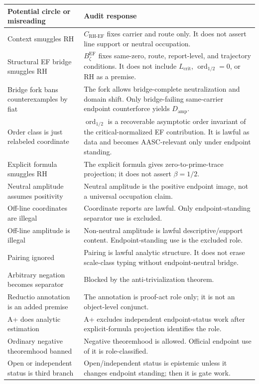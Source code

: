 \documentclass[11pt]{article}
\newcommand{\Lcrit}{L_{\mathrm{crit}}}
\newcommand{\CRHEF}{C_{\mathrm{RH}\text{-}\mathrm{EF}}}
\newcommand{\Damp}{D_{\mathrm{amp}}}
\newcommand{\ordhalf}{\operatorname{ord}_{1/2}}
\newcommand{\BzetaEF}{B^{\mathrm{EF}}_{\zeta}}
\begin{document}
\begin{longtable}{L{0.31\textwidth}L{0.61\textwidth}}
\toprule
\textbf{Potential circle or misreading} & \textbf{Audit response}\\
\midrule
Context smuggles RH & \(\CRHEF\) fixes carrier and route only.  It does not assert line support or neutral occupation.\\
Structural EF bridge smuggles RH & \(\BzetaEF\) fixes same-zero, route, report-level, and trajectory conditions. It does not include \(\Lcrit\), \(\ordhalf=0\), or RH as a premise.\\
Bridge fork bans counterexamples by fiat & The fork allows bridge-complete neutralization and domain shift. Only bridge-failing same-carrier endpoint counterforce yields \(\Damp\).\\
Order class is just relabeled coordinate & \(\ordhalf\) is a recoverable asymptotic order invariant of the critical-normalized EF contribution. It is lawful as data and becomes AASC-relevant only under endpoint standing.\\
Explicit formula smuggles RH & The explicit formula gives zero-to-prime-trace projection; it does not assert \(\beta=1/2\).\\
Neutral amplitude assumes positivity & Neutral amplitude is the positive endpoint image, not a universal occupation claim.\\
Off-line coordinates are illegal & Coordinate reports are lawful.  Only endpoint-standing separator use is excluded.\\
Off-line amplitude is illegal & Non-neutral amplitude is lawful descriptive/support content.  Endpoint-standing use is the excluded role.\\
Pairing ignored & Pairing is lawful analytic structure.  It does not erase scale-class typing without endpoint-neutral bridge.\\
Arbitrary negation becomes separator & Blocked by the anti-trivialization theorem.\\
Reductio annotation is an added premise & The annotation is proof-act role only; it is not an object-level conjunct.\\
A+ does analytic estimation & A+ excludes independent endpoint-status work after explicit-formula projection identifies the role.\\
Ordinary negative theoremhood banned & Negative theoremhood is allowed.  Official endpoint use of it is role-classified.\\
Open or independent status is third branch & Open/independent status is epistemic unless it changes endpoint standing; then it is gate work.\\
\bottomrule
\end{longtable}
\end{document}
